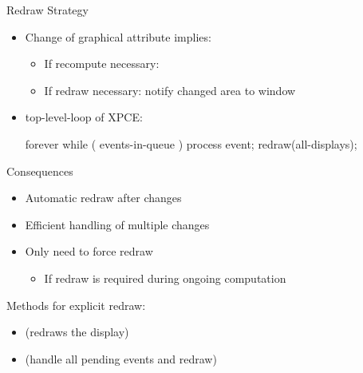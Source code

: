 \begin{sli}{Redraw Strategy}

\begin{itemize}
    \item Change of graphical attribute implies:
    \begin{itemize}
        \item If recompute necessary: 
	\item If redraw necessary: notify changed area to window
    \end{itemize}
    \item top-level-loop of XPCE:
    \begin{code}
    forever
    { while ( events-in-queue )
        process event;
      redraw(all-displays);
    }
    \end{code}

\noindent
\end{itemize}
\end{sli}

\begin{sli}{Consequences}

\begin{itemize}
    \item Automatic redraw after changes
    \item Efficient handling of multiple changes
    \item Only need to force redraw
    \begin{itemize}
        \item If redraw is required during ongoing computation
    \end{itemize}
\end{itemize}

Methods for explicit redraw:

\begin{itemize}
    \item {}  (redraws the display)
    \item {}  (handle all pending events and redraw)
\end{itemize}
\end{sli}


